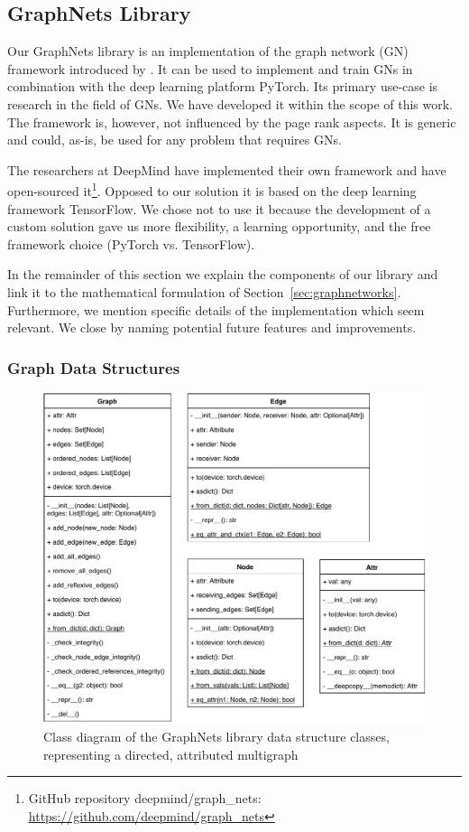 \subsection{GraphNets Library}
\label{sec:gnlib}

Our GraphNets library is an implementation of the graph network (GN) framework introduced by \cite{deepmind:graphnets}. It can be used to implement and train GNs in combination with the deep learning platform PyTorch. Its primary use-case is research in the field of GNs. We have developed it within the scope of this work. The framework is, however, not influenced by the page rank aspects. It is generic and could, as-is, be used for any problem that requires GNs.

The researchers at DeepMind have implemented their own framework and have open-sourced it\footnote{GitHub repository deepmind/graph\_nets: \url{https://github.com/deepmind/graph_nets}}. Opposed to our solution it is based on the deep learning framework TensorFlow. We chose not to use it because the development of a custom solution gave us more flexibility, a learning opportunity, and the free framework choice (PyTorch vs. TensorFlow).

In the remainder of this section we explain the components of our library and link it to the mathematical formulation of Section~\ref{sec:graphnetworks}. Furthermore, we mention specific details of the implementation which seem relevant. We close by naming potential future features and improvements.

\subsubsection{Graph Data Structures}

\begin{figure}\centering
    \includegraphics[scale=0.65]{resources/graphnets-datastructs}
    \caption[Class diagram of the GraphNets library data structure classes]{Class diagram of the GraphNets library data structure classes, representing a directed, attributed multigraph}\label{fig:classdiagramgndatastructs}
\end{figure}

